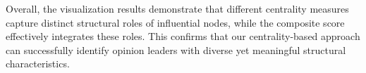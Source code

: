\par Overall, the visualization results demonstrate that different centrality measures capture distinct structural roles of influential nodes, while the composite score effectively integrates these roles. This confirms that our centrality-based approach can successfully identify opinion leaders with diverse yet meaningful structural characteristics.


